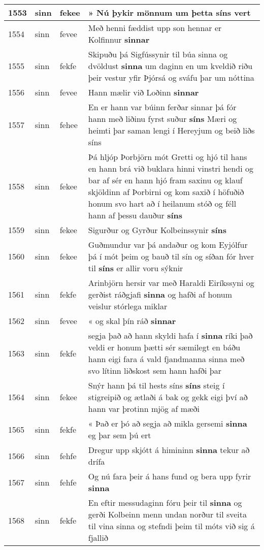 \documentclass{article}
\begin{document}
\begin{longtable}{p{1cm}|p{1cm}|p{1cm}|p{13cm}}
\hline
1553&sinn&fekee&» Nú þykir mönnum um þetta \textbf{síns} vert\\
\hline
1554&sinn&fevee&Með henni fæddist upp son hennar er Kolfinnur \textbf{sinnar} \\
\hline
1555&sinn&fekfe&Skipuðu þá Sigfússynir til búa sinna og dvöldust \textbf{sinna} um daginn en um kveldið riðu þeir vestur yfir Þjórsá og sváfu þar um nóttina\\
\hline
1556&sinn&fevee&Hann mælir við Loðinn \textbf{sinnar} \\
\hline
1557&sinn&fehee&En er hann var búinn ferðar sinnar þá fór hann með liðinu fyrst suður \textbf{síns} Mæri og heimti þar saman lengi í Hereyjum og beið liðs síns\\
\hline
1558&sinn&fekee&Þá hljóp Þorbjörn mót Gretti og hjó til hans en hann brá við buklara hinni vinstri hendi og bar af sér en hann hjó fram saxinu og klauf skjöldinn af Þorbirni og kom saxið í höfuðið honum svo hart að í heilanum stóð og féll hann af þessu dauður \textbf{síns} \\
\hline
1559&sinn&fekee&Sigurður og Gyrður Kolbeinssynir \textbf{síns} \\
\hline
1560&sinn&fekee&Guðmundur var þá andaður og kom Eyjólfur þá í mót þeim og bauð til sín og síðan fór hver til \textbf{síns} er allir voru sýknir\\
\hline
1561&sinn&fekfe&Arinbjörn hersir var með Haraldi Eiríkssyni og gerðist ráðgjafi \textbf{sinna} og hafði af honum veislur stórlega miklar\\
\hline
1562&sinn&fevee&« og skal þín ráð \textbf{sinnar} \\
\hline
1563&sinn&fekfe&segja það að hann skyldi hafa í \textbf{sinna} ríki það veldi er honum þætti sér sæmilegt en báðu hann eigi fara á vald fjandmanna sinna með svo lítinn liðskost sem hann hafði þar\\
\hline
1564&sinn&fekee&Snýr hann þá til hests síns \textbf{síns} steig í stigreipið og ætlaði á bak og gekk eigi því að hann var þrotinn mjög af mæði\\
\hline
1565&sinn&fekfe&« Það er þó að segja að mikla gersemi \textbf{sinna} eg þar sem þú ert\\
\hline
1566&sinn&fehfe&Dregur upp skjótt á himininn \textbf{sinna} tekur að drífa\\
\hline
1567&sinn&fehfe&Og nú fara þeir á hans fund og bera upp fyrir \textbf{sinna} \\
\hline
1568&sinn&fekfe&En eftir messudaginn fóru þeir til \textbf{sinna} og gerði Kolbeinn menn undan norður til sveita til vina sinna og stefndi þeim til móts við sig á fjallið\\

\end{longtable}
\end{document}
